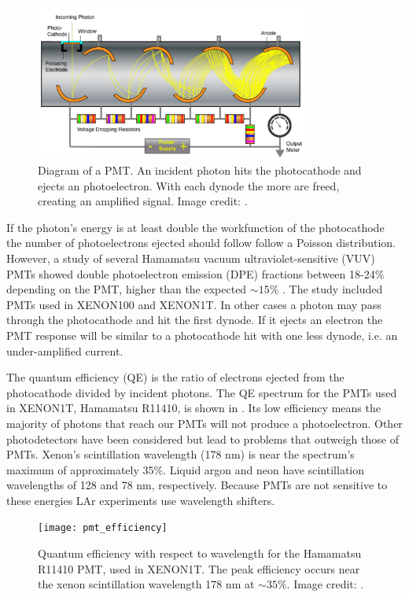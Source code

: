 \begin{figure}
\centering
\includegraphics[width=0.8\textwidth]{PMT1Better}
\caption{Diagram of a PMT.  An incident photon hits the photocathode and ejects an photoelectron.  With each dynode the more \electron are
freed, creating an amplified signal.  Image credit: .}
\label{fig:tpcs_pmts_pmt_diagram}
\end{figure}

If the photon's energy is at least double the workfunction of the photocathode the number of photoelectrons ejected should follow
follow a Poisson distribution.  However, a study of several Hamamatsu vacuum ultraviolet-sensitive (VUV) PMTs showed double
photoelectron emission
(DPE) fractions between 18-24\% depending on the PMT, higher than the expected ${\sim} 15\%$ .  The study included PMTs
used in XENON100 and XENON1T.  In other cases a photon may pass through the photocathode and hit
the first dynode.  If it ejects an electron the PMT response
will be similar to a photocathode hit with one less dynode, i.e. an under-amplified current.  

The quantum efficiency (QE) is the ratio of electrons ejected from the photocathode divided by incident photons.  The QE spectrum for
the PMTs used in XENON1T, Hamamatsu R11410, is shown in .  Its low efficiency means the majority of photons that
reach our PMTs will not produce a photoelectron.  Other photodetectors have been considered but lead to problems that outweigh those
of PMTs.  Xenon's scintillation wavelength (178 nm) is near the spectrum's maximum of approximately 35\%.  Liquid argon and neon have
scintillation wavelengths of 128 and 78 nm, respectively.  Because PMTs are not sensitive to these energies LAr experiments use
wavelength shifters.

\begin{figure}
\centering
\texttt{[image: pmt\_efficiency]}
\caption{Quantum efficiency with respect to wavelength for the Hamamatsu R11410 PMT, used in XENON1T.  The peak efficiency occurs near
the xenon scintillation wavelength 178 nm at ${\sim} 35 \%$.  Image credit: .}
\label{fig:tpcs_pmts_qe}
\end{figure}

